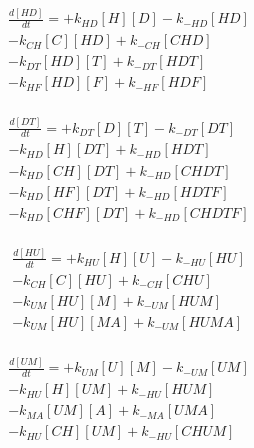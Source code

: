 \begin{equation}
\begin{split}
\frac{d[HD]}{dt} =    + k_{HD}[H][D]    - k_{-HD}[HD]     \\%
                      - k_{CH}[C][HD]   + k_{-CH}[CHD]    \\%
                      - k_{DT}[HD][T]   + k_{-DT}[HDT]    \\%
                      - k_{HF}[HD][F]   + k_{-HF}[HDF]    \\%
\end{split}
\end{equation}

\begin{equation}
\begin{split}
\frac{d[DT]}{dt} =    + k_{DT}[D][T]    - k_{-DT}[DT]     \\%
                      - k_{HD}[H][DT]   + k_{-HD}[HDT]    \\%
                      - k_{HD}[CH][DT]  + k_{-HD}[CHDT]   \\%
                      - k_{HD}[HF][DT]  + k_{-HD}[HDTF]   \\%
                      - k_{HD}[CHF][DT]  + k_{-HD}[CHDTF]   \\%
\end{split}
\end{equation}

\begin{equation}
\begin{split}
\frac{d[HU]}{dt} =    + k_{HU}[H][U]    - k_{-HU}[HU]     \\%
                      - k_{CH}[C][HU]   + k_{-CH}[CHU]    \\%
                      - k_{UM}[HU][M]   + k_{-UM}[HUM]    \\%
                      - k_{UM}[HU][MA]  + k_{-UM}[HUMA]   \\%
\end{split}
\end{equation}

\begin{equation}
\begin{split}
\frac{d[UM]}{dt} =    + k_{UM}[U][M]    - k_{-UM}[UM]     \\%
                      - k_{HU}[H][UM]   + k_{-HU}[HUM]    \\%
                      - k_{MA}[UM][A]   + k_{-MA}[UMA]    \\%
                      - k_{HU}[CH][UM]  + k_{-HU}[CHUM]   \\%
\end{split}
\end{equation}

